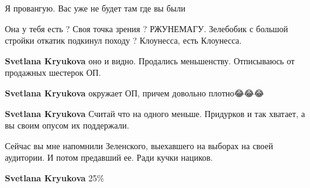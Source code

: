 \begin{itemize}
\begin{itemize}
Я провангую. Вас уже не будет там где вы были

 
Она у тебя есть ? Своя точка зрения ? РЖУНЕМАГУ. Зелебобик с большой стройки откатик подкинул походу ? Клоунесса, есть Клоунесса.

 
\textbf{Svetlana Kryukova} оно и видно. Продались меньшенству. Отписываюсь от продажных шестерок ОП.

 
\textbf{Svetlana Kryukova} окружает ОП, причем довольно плотно😂😂😂

 
\textbf{Svetlana Kryukova} Считай что на одного меньше. Придурков и так хватает, а вы своим опусом их поддержали.

 
Сейчас вы мне напомнили Зеленского, выехавшего на выборах на своей аудитории. И потом предавший ее. Ради кучки нациков.

 
\textbf{Svetlana Kryukova} 25\%

 

\end{itemize}
\end{itemize}
